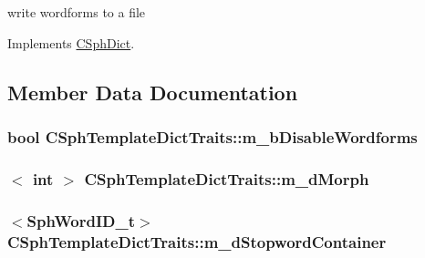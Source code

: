 write wordforms to a file 



Implements \hyperlink{classCSphDict_af490ff06f000637b7cb3ce5660ac1cba}{C\-Sph\-Dict}.



\subsection{Member Data Documentation}
\hypertarget{structCSphTemplateDictTraits_aeb6ff537f9a46b9355ec1fd15fc4435c}{
\subsubsection[{m\-\_\-b\-Disable\-Wordforms}]{\setlength{\rightskip}{0pt plus 5cm}bool C\-Sph\-Template\-Dict\-Traits\-::m\-\_\-b\-Disable\-Wordforms\hspace{0.3cm}{\ttfamily [protected]}}}\label{structCSphTemplateDictTraits_aeb6ff537f9a46b9355ec1fd15fc4435c}
\hypertarget{structCSphTemplateDictTraits_a456fd4bc5cd4f62dbaced4d8d424eeb9}{
\subsubsection[{m\-\_\-d\-Morph}]{$<$ {\bf int} $>$ C\-Sph\-Template\-Dict\-Traits\-::m\-\_\-d\-Morph\hspace{0.3cm}{\ttfamily [protected]}}}\label{structCSphTemplateDictTraits_a456fd4bc5cd4f62dbaced4d8d424eeb9}
\hypertarget{structCSphTemplateDictTraits_a8a07412ac0515c8223e97108289baf83}{
\subsubsection[{m\-\_\-d\-Stopword\-Container}]{$<${\bf Sph\-Word\-I\-D\-\_\-t}$>$ C\-Sph\-Template\-Dict\-Traits\-::m\-\_\-d\-Stopword\-Container\hspace{0.3cm}{\ttfamily [protected]}}}\label{structCSphTemplateDictTraits_a8a07412ac0515c8223e97108289baf83}
